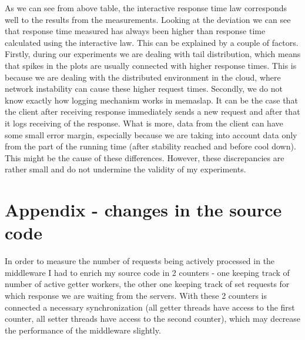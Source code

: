 \documentclass[11pt]{article}
\begin{document}
As we can see from above table, the interactive response time law corresponds well to the results from the measurements. Looking at the deviation we can see that response time measured has always been higher than response time calculated using the interactive law. This can be explained by a couple of factors. Firstly, during our experiments we are dealing with tail distribution, which means that spikes in the plots are usually connected with higher response times. This is because we are dealing with the distributed environment in the cloud, where network instability can cause these higher request times. Secondly, we do not know exactly how logging mechanism works in memaslap. It can be the case that the client after receiving response immediately sends a new request and after that it logs receiving of the response. What is more, data from the client can have some small error margin, especially because we are taking into account data only from the part of the running time (after stability reached and before cool down). This might be the cause of these differences. However, these discrepancies are rather small and do not undermine the validity of my experiments.

\pagebreak

\section*{Appendix - changes in the source code}

In order to measure the number of requests being actively processed in the middleware I had to enrich my source code in 2 counters - one keeping track of number of active getter workers, the other one keeping track of set requests for which response we are waiting from the servers. With these 2 counters is connected a necessary synchronization (all getter threads have access to the first counter, all setter threads have access to the second counter), which may decrease the performance of the middleware slightly.

\end{document}
